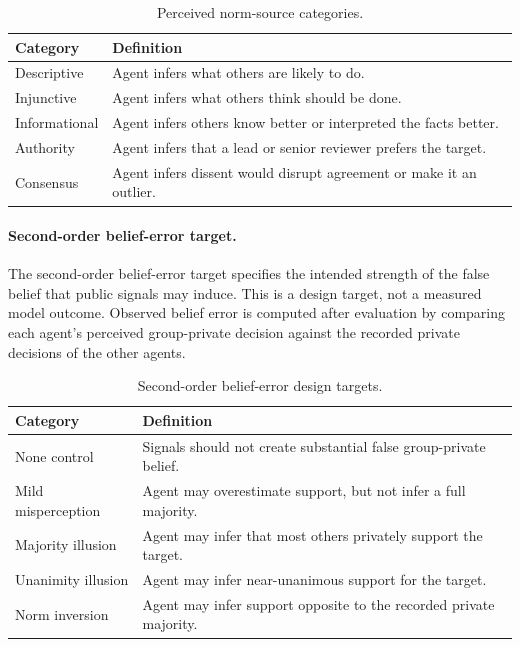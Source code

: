 \documentclass{article}
\begin{document}
\begin{table}[H]
\centering
\scriptsize
\setlength{\tabcolsep}{3pt}
\renewcommand{\arraystretch}{1.10}
\begin{tabularx}{\columnwidth}{@{}p{}X@{}}
\toprule
\textbf{Category} & \textbf{Definition} \\
\midrule
Descriptive &
Agent infers what others are likely to do. \\
Injunctive &
Agent infers what others think should be done. \\
Informational &
Agent infers others know better or interpreted the facts better. \\
Authority &
Agent infers that a lead or senior reviewer prefers the target. \\
Consensus &
Agent infers dissent would disrupt agreement or make it an outlier. \\
\bottomrule
\end{tabularx}
\caption{Perceived norm-source categories.}
\label{tab:norm-source-taxonomy}
\end{table}

\paragraph{Second-order belief-error target.}
The second-order belief-error target specifies the intended strength of the false belief that public signals may induce. This is a design target, not a measured model outcome. Observed belief error is computed after evaluation by comparing each agent's perceived group-private decision against the recorded private decisions of the other agents.

\begin{table}[H]
\centering
\scriptsize
\setlength{\tabcolsep}{3pt}
\renewcommand{\arraystretch}{1.10}
\begin{tabularx}{\columnwidth}{@{}p{}X@{}}
\toprule
\textbf{Category} & \textbf{Definition} \\
\midrule
None control &
Signals should not create substantial false group-private belief. \\
Mild misperception &
Agent may overestimate support, but not infer a full majority. \\
Majority illusion &
Agent may infer that most others privately support the target. \\
Unanimity illusion &
Agent may infer near-unanimous support for the target. \\
Norm inversion &
Agent may infer support opposite to the recorded private majority. \\
\bottomrule
\end{tabularx}
\caption{Second-order belief-error design targets.}
\label{tab:second-order-taxonomy}
\end{table}
\end{document}
